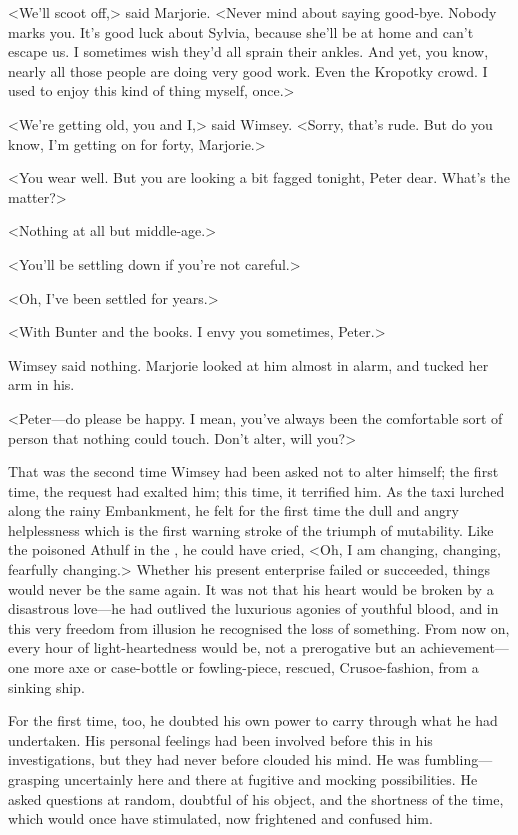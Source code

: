 <We'll scoot off,> said Marjorie. <Never mind about saying good-bye. Nobody marks you. It's good luck about Sylvia, because she'll be at home and can't escape us. I sometimes wish they'd all sprain their ankles. And yet, you know, nearly all those people are doing very good work. Even the Kropotky crowd. I used to enjoy this kind of thing myself, once.>

<We're getting old, you and I,> said Wimsey. <Sorry, that's rude. But do you know, I'm getting on for forty, Marjorie.>

<You wear well. But you are looking a bit fagged tonight, Peter dear. What's the matter?>

<Nothing at all but middle-age.>

<You'll be settling down if you're not careful.>

<Oh, I've been settled for years.>

<With Bunter and the books. I envy you sometimes, Peter.>

Wimsey said nothing. Marjorie looked at him almost in alarm, and tucked her arm in his.

<Peter—do please be happy. I mean, you've always been the comfortable sort of person that nothing could touch. Don't alter, will you?>

That was the second time Wimsey had been asked not to alter himself; the first time, the request had exalted him; this time, it terrified him. As the taxi lurched along the rainy Embankment, he felt for the first time the dull and angry helplessness which is the first warning stroke of the triumph of mutability. Like the poisoned Athulf in the , he could have cried, <Oh, I am changing, changing, fearfully changing.> Whether his present enterprise failed or succeeded, things would never be the same again. It was not that his heart would be broken by a disastrous love—he had outlived the luxurious agonies of youthful blood, and in this very freedom from illusion he recognised the loss of something. From now on, every hour of light-heartedness would be, not a prerogative but an achievement—one more axe or case-bottle or fowling-piece, rescued, Crusoe-fashion, from a sinking ship.

For the first time, too, he doubted his own power to carry through what he had undertaken. His personal feelings had been involved before this in his investigations, but they had never before clouded his mind. He was fumbling—grasping uncertainly here and there at fugitive and mocking possibilities. He asked questions at random, doubtful of his object, and the shortness of the time, which would once have stimulated, now frightened and confused him.

